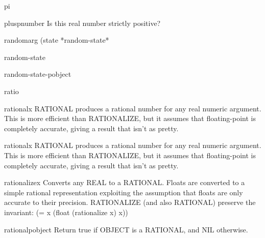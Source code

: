 \begin{constant}{pi}{}{}
  
\end{constant}

\begin{function}{plusp}{number}{}
  Is this real number strictly positive?
\end{function}

\begin{function}{random}{arg \op (state *random-state*}{}
  
\end{function}

\begin{class}{random-state}{}{}
  
\end{class}

\begin{function}{random-state-p}{object}{}
  
\end{function}

\begin{class}{ratio}{}{}
  
\end{class}

\begin{function}{rational}{x}{}
  RATIONAL produces a rational number for any real numeric argument. This is
  more efficient than RATIONALIZE, but it assumes that floating-point is
  completely accurate, giving a result that isn't as pretty.
\end{function}

\begin{class}{rational}{x}{}
  RATIONAL produces a rational number for any real numeric argument. This is
  more efficient than RATIONALIZE, but it assumes that floating-point is
  completely accurate, giving a result that isn't as pretty.
\end{class}

\begin{function}{rationalize}{x}{}
  Converts any REAL to a RATIONAL.  Floats are converted to a simple rational
  representation exploiting the assumption that floats are only accurate to
  their precision.  RATIONALIZE (and also RATIONAL) preserve the invariant:
      (= x (float (rationalize x) x))
\end{function}

\begin{function}{rationalp}{object}{}
  Return true if OBJECT is a RATIONAL, and NIL otherwise.
\end{function}

